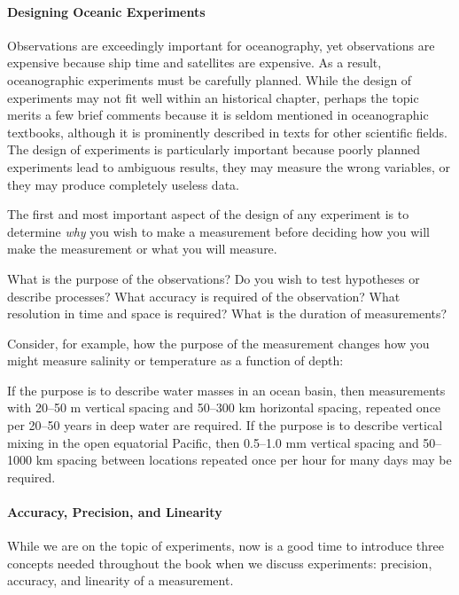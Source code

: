\paragraph{Designing Oceanic Experiments}
Observations are exceedingly important
for ocean\-ography, yet observations are expensive because ship
time and satellites are expensive. As a result, oceanographic
experiments must be carefully planned. While the design of
experiments may not fit well within an historical chapter, perhaps
the topic merits a few brief comments because it is seldom
mentioned in oceanographic textbooks, although it is prominently
described in texts for other scientific fields. The design of
experiments is particularly important because poorly planned
experiments lead to ambiguous results, they may measure the wrong
variables, or they may produce completely useless data.

The first and most important aspect of the design of any experiment is to
determine \textit{why} you wish to make a measurement before deciding how you will
make the measurement or what you will measure.
\begin{enumerate}
\vitem What is the purpose of the observations? Do you wish to test hypotheses or
describe processes?
\vitem What accuracy is required of the observation?
\vitem What resolution in time and space is required?
What is the duration of measurements?
\end{enumerate}
Consider, for example, how the purpose of the measurement changes how you might
measure salinity or temperature as a function of depth:
\begin{enumerate}
\vitem If the purpose is to describe water masses in an ocean basin, then measurements with
20--50 m vertical spacing and 50--300 km horizontal spacing, repeated once per 20--50 years in
deep water are required.
\vitem If the purpose is to describe vertical mixing in the open equatorial Pacific, then 0.5--1.0 mm vertical spacing and 50--1000 km spacing between locations repeated once per
hour for many days may be required.
\end{enumerate}

\paragraph{Accuracy, Precision, and Linearity}
While we are on the topic of experiments, now is a good time to introduce three
concepts needed throughout the book when we discuss experiments: precision,
accuracy, and linearity of a measurement.


